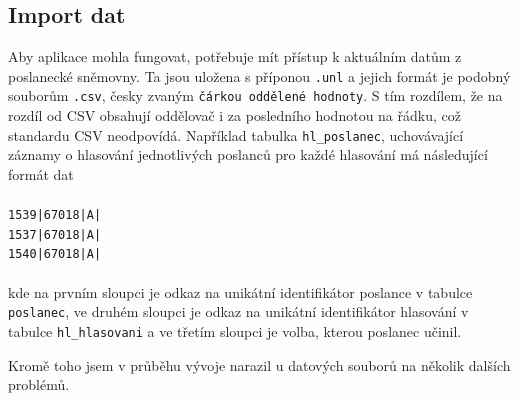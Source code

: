 \subsection{Import dat}
\label{import_dat}
Aby aplikace mohla fungovat, potřebuje mít přístup k aktuálním datům z poslanecké sněmovny. Ta jsou uložena s příponou \texttt{.unl} a jejich formát je podobný souborům \texttt{.csv}, česky zvaným \texttt{čárkou oddělené hodnoty}. S tím rozdílem, že na rozdíl od CSV obsahují oddělovač i za posledního hodnotou na řádku, což standardu CSV neodpovídá\cite{RFC4180}. Například tabulka \texttt{hl\_poslanec}, uchovávající záznamy o hlasování jednotlivých poslanců pro každé hlasování má následující formát dat\\
\\
\texttt{1539|67018|A|\\
1537|67018|A|\\
1540|67018|A|}\\
\\
kde na prvním sloupci je odkaz na unikátní identifikátor poslance v tabulce \texttt{poslanec}, ve druhém sloupci je odkaz na unikátní identifikátor hlasování v tabulce \texttt{hl\_hlasovani} a ve třetím sloupci je volba, kterou poslanec učinil. 

\par Kromě toho jsem v průběhu vývoje narazil u datových souborů na několik dalších problémů.

